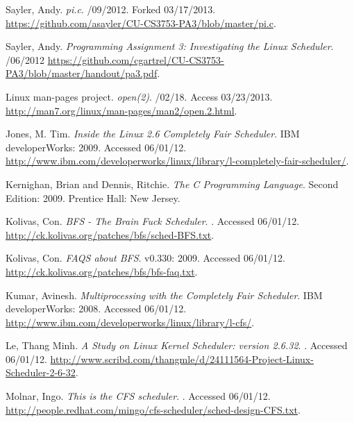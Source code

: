 \begin{thebibliography}{9}      %

 Sayler, Andy.
  \newblock \emph{pi.c}.
  /09/2012.
  \newblock Forked 03/17/2013.
  \newblock \url{https://github.com/asayler/CU-CS3753-PA3/blob/master/pi.c}.

 Sayler, Andy.
  \newblock \emph{Programming Assignment 3: Investigating the Linux Scheduler}.
  /06/2012
  \newblock \url{https://github.com/cgartrel/CU-CS3753-PA3/blob/master/handout/pa3.pdf}.

 Linux man-pages project.
  \newblock \emph{open(2)}.
  /02/18.
  \newblock Access 03/23/2013.
  \newblock \url{http://man7.org/linux/man-pages/man2/open.2.html}.

 Jones, M. Tim.
  \newblock \emph{Inside the Linux 2.6 Completely Fair Scheduler}.
  \newblock IBM developerWorks: 2009.
  \newblock Accessed 06/01/12.
  \newblock \url{http://www.ibm.com/developerworks/linux/library/l-completely-fair-scheduler/}.

 Kernighan, Brian and Dennis, Ritchie.
  \newblock \emph{The C Programming Language}.
  \newblock Second Edition: 2009.
  \newblock Prentice Hall: New Jersey.

 Kolivas, Con.
  \newblock \emph{BFS - The Brain Fuck Scheduler}.
  .
  \newblock Accessed 06/01/12.
  \newblock \url{http://ck.kolivas.org/patches/bfs/sched-BFS.txt}.

 Kolivas, Con.
  \newblock \emph{FAQS about BFS}.
  \newblock v0.330: 2009.
  \newblock Accessed 06/01/12.
  \newblock \url{http://ck.kolivas.org/patches/bfs/bfs-faq.txt}.

 Kumar, Avinesh.
  \newblock \emph{Multiprocessing with the Completely Fair Scheduler}.
  \newblock IBM developerWorks: 2008.
  \newblock Accessed 06/01/12.
  \newblock \url{http://www.ibm.com/developerworks/linux/library/l-cfs/}.

 Le, Thang Minh.
  \newblock \emph{A Study on Linux Kernel Scheduler: version 2.6.32}.
  .
  \newblock Accessed 06/01/12.
  \newblock \url{http://www.scribd.com/thangmle/d/24111564-Project-Linux-Scheduler-2-6-32}.

 Molnar, Ingo.
  \newblock \emph{This is the CFS scheduler}.
  .
  \newblock Accessed 06/01/12.
  \newblock \url{http://people.redhat.com/mingo/cfs-scheduler/sched-design-CFS.txt}.

\end{thebibliography}
